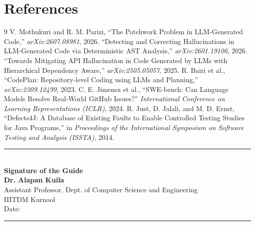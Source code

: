 \documentclass[10pt,a4paper]{article}
\begin{document}
\section{References}
\begin{thebibliography}{9}\setlength{\itemsep}{0.5pt}\scriptsize
{} V. Mothukuri and R. M. Parizi, ``The Patchwork Problem in LLM-Generated Code,'' \emph{arXiv:2607.08981}, 2026.
 ``Detecting and Correcting Hallucinations in LLM-Generated Code via Deterministic AST Analysis,'' \emph{arXiv:2601.19106}, 2026.
 ``Towards Mitigating API Hallucination in Code Generated by LLMs with Hierarchical Dependency Aware,'' \emph{arXiv:2505.05057}, 2025.
 R. Bairi et al., ``CodePlan: Repository-level Coding using LLMs and Planning,'' \emph{arXiv:2309.12499}, 2023.
 C. E. Jimenez et al., ``SWE-bench: Can Language Models Resolve Real-World GitHub Issues?'' \emph{International Conference on Learning Representations (ICLR)}, 2024.
 R. Just, D. Jalali, and M. D. Ernst, ``Defects4J: A Database of Existing Faults to Enable Controlled Testing Studies for Java Programs,'' in \emph{Proceedings of the International Symposium on Software Testing and Analysis (ISSTA)}, 2014.
\end{thebibliography}

\vspace{0.3cm}
\begin{flushright}
\begin{minipage}{6.0cm}
\rule{6.0cm}{0.4pt}\\[1pt]
\textbf{Signature of the Guide}\\
\textbf{Dr. Alapan Kuila}\\
Assistant Professor, Dept. of Computer Science and Engineering\\
IIITDM Kurnool\\
Date: \rule{3.0cm}{0.4pt}
\end{minipage}
\end{flushright}
\end{document}
